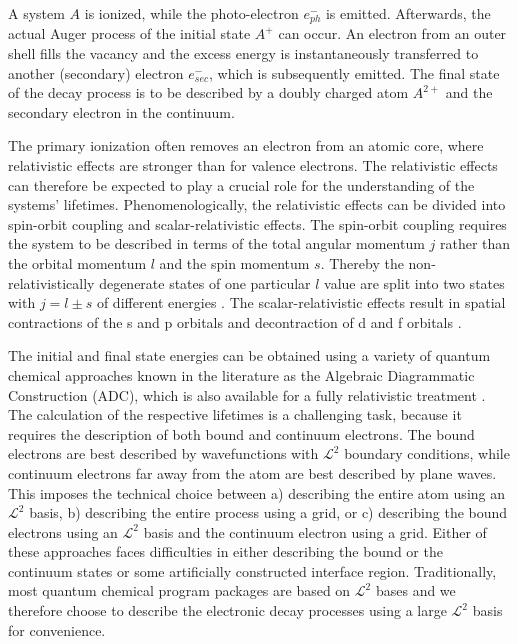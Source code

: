 A system $A$ is ionized, while the photo-electron $e^-_{ph}$ is emitted.      
Afterwards, the actual Auger process of the initial state $A^+$ can occur.    
An electron from an outer                                       
shell fills the vacancy and the excess energy is instantaneously transferred  
to another (secondary) electron $e^-_{sec}$, which              
is subsequently emitted. The final state of the decay process   
is to be described by a doubly charged atom $A^{2+}$ and the secondary        
electron in the continuum.

The primary ionization often removes an electron from an atomic core, where
relativistic effects are stronger than for valence electrons. The relativistic
effects can therefore be expected to play a crucial role for the understanding
of the systems' lifetimes.
Phenomenologically, the relativistic effects can be divided  
into spin-orbit coupling and scalar-relativistic effects. The spin-orbit       
coupling requires the system to be described in terms of the total angular     
momentum $j$ rather than the orbital momentum $l$ and the spin momentum $s$.   
Thereby the non-relativistically degenerate states of one particular $l$       
value are split into two states with $j=l\pm s$ of different energies          
\cite{ReiherWolf09}.                                            
The scalar-relativistic effects result in spatial               
contractions of the s and p orbitals                            
and decontraction of d and f orbitals \cite{ReiherWolf09}.

The initial and final state energies can be obtained using      
a variety of quantum chemical approaches known in the literature as the       
Algebraic Diagrammatic Construction \cite{Schirmer82_1,Schirmer91,Schirmer98, 
Mertins96_1} (ADC), which is also                               
available for a fully relativistic treatment                    
\cite{Pernpointner04_1,Pernpointner04_2,Pernpointner10_1}.
The calculation of the respective lifetimes is a challenging task, because it
requires the description of both bound and continuum electrons. The bound electrons
are best described by wavefunctions with $\mathcal{L}^2$ boundary conditions,
while continuum electrons far away from the atom are best described by
plane waves. This imposes the technical choice between a) describing the entire
atom using an $\mathcal{L}^2$ basis, b) describing the entire process using
a grid, or c) describing the bound electrons using an $\mathcal{L}^2$ basis
and the continuum electron using a grid.
Either     
of these approaches faces difficulties in either describing the bound or the  
continuum states or some artificially constructed interface region.
Traditionally, most quantum
chemical program packages are based on $\mathcal{L}^2$ bases and we therefore
choose to describe the electronic decay processes using a large $\mathcal{L}^2$
basis for convenience.

